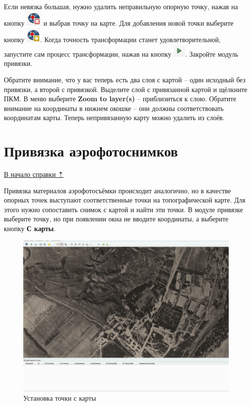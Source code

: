\documentclass[
  12pt,
]{book}
\begin{document}
Если невязка большая, нужно удалить неправильную опорную точку, нажав на кнопку \includegraphics{images/Georeference/Delete_point.png} и выбрав точку на карте. Для добавления новой точки выберите кнопку \includegraphics{images/Georeference/Add_point.png}. Когда точность трансформации станет удовлетворительной, запустите сам процесс трансформации, нажав на кнопку \includegraphics{images/Georeference/Transformation_button.png}. Закройте модуль привязки.

Обратите внимание, что у вас теперь есть два слоя с картой -- один исходный без привязки, а второй с привязкой. Выделите слой с привязанной картой и щёлкните ПКМ. В меню выберите \textbf{Zoom to layer(s)} -- приблизиться к слою. Обратите внимание на координаты в нижнем окошке -- они должны соответствовать координатам карты. Теперь непривязанную карту можно удалить из слоёв.

\section{Привязка аэрофотоснимков}\label{georeference-aerial}

\hyperref[georeference]{В начало справки ⇡}

Привязка материалов аэрофотосъёмки происходит аналогично, но в качестве опорных точек выступают соответственные точки на топографической карте. Для этого нужно сопоставить снимок с картой и найти эти точки. В модуле привязке выберите точку, но при появлении окна не вводите координаты, а выберите кнопку \textbf{С карты}.

\begin{figure}
\centering
\includegraphics{images/Georeference/Reference_aerial.gif}
\caption{Установка точки с карты}
\end{figure}
\end{document}
